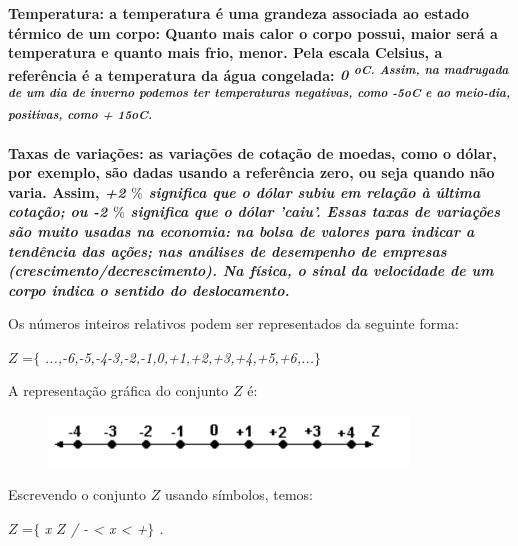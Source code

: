 \documentclass[12pt]{article}
\renewcommand{\_}{\kern-1.5pt\textunderscore\kern-1.5pt}
\begin{document}
\textbf{Temperatura: a temperatura é uma grandeza associada ao estado térmico de um corpo: Quanto mais calor o corpo possui, maior será a temperatura e quanto mais frio, menor. Pela escala Celsius, a referência é a temperatura da água congelada: \textit{0 \textsuperscript{oC. Assim, na madrugada de um dia de inverno podemos ter temperaturas negativas, como -5oC e ao meio-dia, positivas, como + 15oC.}}}\par

\textbf{Taxas de variações: as variações de cotação de moedas, como o dólar, por exemplo, são dadas usando a referência zero, ou seja quando não varia. Assim, \textit{+2 $\%$  significa que o dólar subiu em relação à última cotação; ou -2 $\%$  significa que o dólar 'caiu'. Essas taxas de variações são muito usadas na economia: na bolsa de valores para indicar a tendência das ações; nas análises de desempenho de empresas (crescimento/decrescimento). Na física, o sinal da velocidade de um corpo indica o sentido do deslocamento. }}\par

Os números inteiros relativos podem ser representados da seguinte forma: \par

 \( Z \)  =$ \{ $ \textit{...,-6,-5,-4-3,-2,-1,0,+1,+2,+3,+4,+5,+6,...$ \} $ }\par

A representação gráfica do conjunto  \( Z \)  é:\par




\begin{figure}[H]
	\begin{Center}
		\includegraphics[width=3.77in,height=0.54in]{./media/image6.pdf}
	\end{Center}
\end{figure}



\par

Escrevendo o conjunto  \( Z \)  usando símbolos, temos: \par

 \( Z \)  =$ \{ $ \textit{ x   \( Z \)  / - < x < +$ \} $ .}\par
\end{document}
